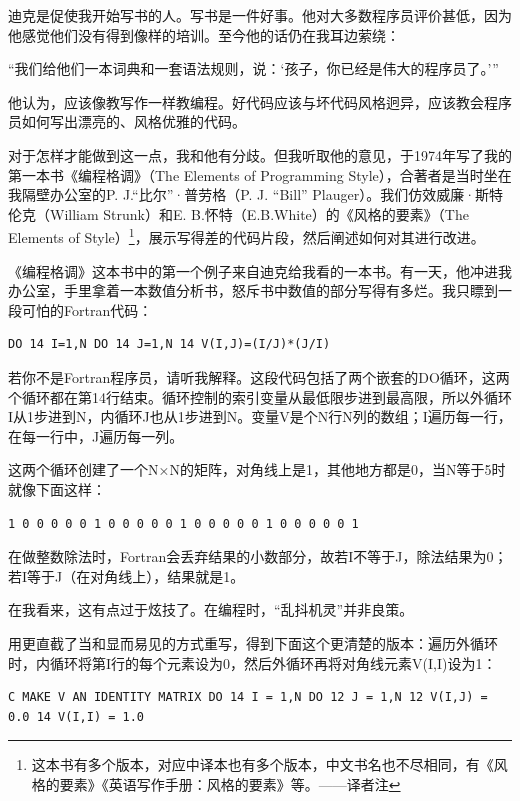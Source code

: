 \documentclass[a4paper,12pt,UTF8,twoside]{ctexbook}
\begin{document}
迪克是促使我开始写书的人。写书是一件好事。他对大多数程序员评价甚低，因为他感觉他们没有得到像样的培训。至今他的话仍在我耳边萦绕：

“我们给他们一本词典和一套语法规则，说：‘孩子，你已经是伟大的程序员了。’”

他认为，应该像教写作一样教编程。好代码应该与坏代码风格迥异，应该教会程序员如何写出漂亮的、风格优雅的代码。

对于怎样才能做到这一点，我和他有分歧。但我听取他的意见，于1974年写了我的第一本书《编程格调》（The Elements of Programming Style），合著者是当时坐在我隔壁办公室的P. J.“比尔”·普劳格（P. J. “Bill” Plauger）。我们仿效威廉·斯特伦克（William Strunk）和E. B.怀特（E.B.White）的《风格的要素》（The Elements of Style）\footnote{这本书有多个版本，对应中译本也有多个版本，中文书名也不尽相同，有《风格的要素》《英语写作手册：风格的要素》等。——译者注}，展示写得差的代码片段，然后阐述如何对其进行改进。

《编程格调》这本书中的第一个例子来自迪克给我看的一本书。有一天，他冲进我办公室，手里拿着一本数值分析书，怒斥书中数值的部分写得有多烂。我只瞟到一段可怕的Fortran代码：

\begin{lstlisting}
DO 14 I=1,N DO 14 J=1,N 14 V(I,J)=(I/J)*(J/I)
\end{lstlisting}

若你不是Fortran程序员，请听我解释。这段代码包括了两个嵌套的DO循环，这两个循环都在第14行结束。循环控制的索引变量从最低限步进到最高限，所以外循环I从1步进到N，内循环J也从1步进到N。变量V是个N行N列的数组；I遍历每一行，在每一行中，J遍历每一列。

这两个循环创建了一个N×N的矩阵，对角线上是1，其他地方都是0，当N等于5时就像下面这样：

\begin{lstlisting}
1 0 0 0 0 0 1 0 0 0 0 0 1 0 0 0 0 0 1 0 0 0 0 0 1
\end{lstlisting}

在做整数除法时，Fortran会丢弃结果的小数部分，故若I不等于J，除法结果为0；若I等于J（在对角线上），结果就是1。

在我看来，这有点过于炫技了。在编程时，“乱抖机灵”并非良策。

用更直截了当和显而易见的方式重写，得到下面这个更清楚的版本：遍历外循环时，内循环将第I行的每个元素设为0，然后外循环再将对角线元素V(I,I)设为1：

\begin{lstlisting}
C MAKE V AN IDENTITY MATRIX DO 14 I = 1,N DO 12 J = 1,N 12 V(I,J) = 0.0 14 V(I,I) = 1.0
\end{lstlisting}
\end{document}
